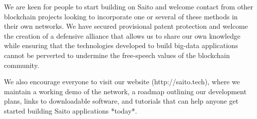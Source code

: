 \documentclass[11.5pt, oneside]{article}   	%
\begin{document}
\begin{multicols}{2}
We are keen for people to start building on Saito and welcome contact from other blockchain projects looking to incorporate one or several of these methods in their own networks. We have secured provisional patent protection and welcome the creation of a defensive alliance that allows us to share our own knowledge while ensuring that the technologies developed to build big-data applications cannot be perverted to undermine the free-speech values of the blockchain community.

We also encourage everyone to visit our website (http://saito.tech), where we maintain a working demo of the network, a roadmap outlining our development plans, links to downloadable software, and tutorials that can help anyone get started building Saito applications *today*. 

\end{multicols} 
\end{document}
